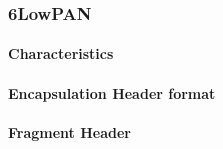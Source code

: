 
\subsubsection{6LowPAN}



\paragraph{Characteristics}

%	
\paragraph{Encapsulation Header format}

\paragraph{Fragment Header}

